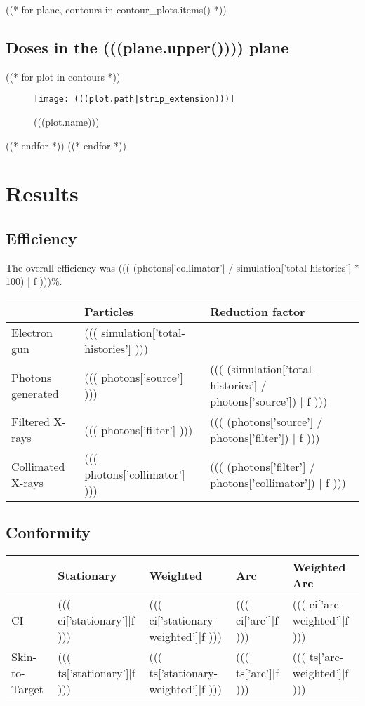 \documentclass[12pt]{article}
\begin{document}

((* for plane, contours in contour_plots.items() *))
	\subsection{Doses in the (((plane.upper()))) plane}
	((* for plot in contours *))
	\begin{figure}[H]
	\centering
	\texttt{[image: (((plot.path|strip\_extension)))]}
	\caption{(((plot.name)))}
	\end{figure}
	((* endfor *))
((* endfor *))

\section{Results}

\subsection{Efficiency}
The overall efficiency was ((( (photons['collimator'] / simulation['total-histories'] * 100) | f )))\%.
\begin{table}[H]
\begin{tabular}{l l l}
	& Particles & Reduction factor \\
	\hline
	Electron gun & ((( simulation['total-histories'] ))) & \\
	Photons generated & ((( photons['source'] ))) & ((( (simulation['total-histories'] / photons['source']) | f ))) \\
	Filtered X-rays & ((( photons['filter'] ))) & ((( (photons['source'] / photons['filter']) | f ))) \\
	Collimated X-rays & ((( photons['collimator'] ))) & ((( (photons['filter'] / photons['collimator']) | f )))
\end{tabular}
\end{table}

\subsection{Conformity}
\begin{table}[H]
\begin{tabular}{l l l l l}
	& Stationary & Weighted & Arc & Weighted Arc \\
	\hline
	CI & ((( ci['stationary']|f ))) & ((( ci['stationary-weighted']|f ))) & ((( ci['arc']|f ))) & ((( ci['arc-weighted']|f ))) \\
	Skin-to-Target & ((( ts['stationary']|f ))) & ((( ts['stationary-weighted']|f ))) & ((( ts['arc']|f ))) & ((( ts['arc-weighted']|f )))
\end{tabular}
\end{table}
\end{document}
